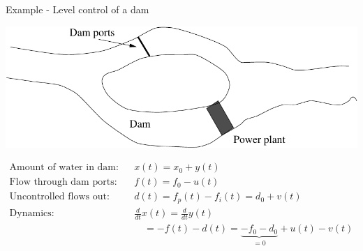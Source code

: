 \documentclass[presentation,aspectratio=169]{beamer}
\begin{document}
\begin{frame}[label={sec:orgc88054a}]{Example - Level control of a dam}
\begin{center}
\includegraphics[width=0.5\linewidth]{../../figures/kraftverk}
\end{center}

\begin{align*}
\text{Amount of water in dam:}\quad & x(t) = x_0 + y(t)\\
\text{Flow through dam ports:}\quad & f(t) = f_0 - u(t)\\
\text{Uncontrolled flows out:}\quad & d(t) = f_p(t) - f_i(t) = d_0 + v(t)\\
\text{Dynamics:}\quad & \frac{d}{dt} x(t) = \frac{d}{dt} y(t)\\ &\quad = - f(t) - d(t) = \underbrace{-f_0 - d_0}_{=0} + u(t) - v(t)\\
\end{align*}
\end{frame}
\end{document}
